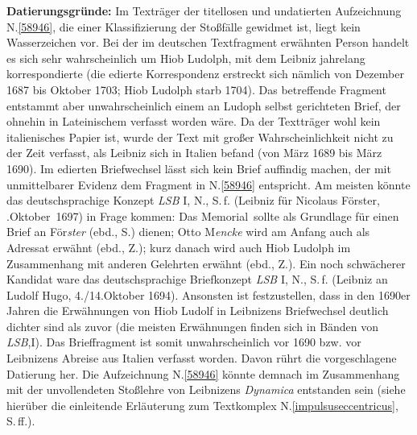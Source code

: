 \begin{ledgroup}%
\footnotesize%
\pstart%
\noindent%
\textbf{Datierungsgründe:}
Im Texträger der titellosen und undatierten Aufzeichnung N.\;\ref{58946}, die einer Klassifizierung der Stoßfälle gewidmet ist, liegt kein Wasserzeichen vor.
Bei der im deutschen Textfragment erwähnten Person handelt es sich sehr wahrscheinlich um Hiob Ludolph,
mit dem Leibniz jahrelang korrespondierte
(die edierte Korrespondenz erstreckt sich nämlich von Dezember 1687 bis Oktober 1703; Hiob Ludolph starb 1704).
Das betreffende Fragment entstammt aber unwahrscheinlich einem an Ludoph selbst gerichteten Brief, der ohnehin in Lateinischem verfasst worden wäre.
Da der Textträger wohl kein italienisches Papier ist, wurde der Text mit großer Wahrscheinlichkeit nicht zu der Zeit verfasst, als Leibniz sich in Italien befand (von März 1689 bis März 1690).
\pend%
\pstart%
Im edierten Briefwechsel lässt sich kein Brief auffindig machen, der mit unmittelbarer Evidenz dem Fragment in N.\;\ref{58946} entspricht.
Am meisten könnte das deutschsprachige Konzept \textit{LSB} I, N., S.\,f.\cite{01424} (Leibniz für Nicolaus Förster, .\;Oktober\rbrack\ 1697) in Frage kommen:
Das \glqq Memorial\grqq\ sollte als Grundlage für einen Brief an För\textit{ster} (ebd., S.) dienen;
Otto M\textit{encke} wird am Anfang auch als Adressat erwähnt (ebd., Z.);
kurz danach wird auch Hiob Ludolph im Zusammenhang mit anderen Gelehrten erwähnt (ebd., Z.).
Ein noch schwächerer Kandidat ware das deutschsprachige Briefkonzept \textit{LSB} I, N., S.\,f.\cite{01423} (Leibniz an Ludolf Hugo, 4./14.\;Oktober 1694).
Ansonsten ist festzustellen, dass in den 1690er Jahren die Erwähnungen von Hiob Ludolf in Leibnizens Briefwechsel deutlich dichter sind als zuvor (die meisten Erwähnungen finden sich in Bänden von \textit{LSB},\;I).
Das Brieffragment ist somit unwahrscheinlich vor 1690 bzw. vor Leibnizens Abreise aus Italien verfasst worden.
Davon rührt die vorgeschlagene Datierung her.
Die Aufzeichnung N.\;\ref{58946} könnte demnach im Zusammenhang mit der unvollendeten Stoßlehre von Leibnizens \textit{Dynamica}\cite{01354} entstanden sein (siehe hierüber die einleitende Erläuterung zum Textkomplex N.\;\ref{impulsuseccentricus}, S.\;\pageref{impulsecc_intro}\,ff.).

\end{ledgroup}
